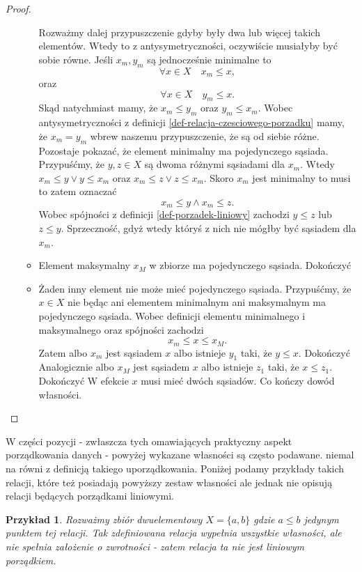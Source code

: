 \documentclass[12pt,a4paper]{report}
\newtheorem{example}{Przykład}
\begin{document}
\begin{proof}
\begin{enumerate}
\begin{itemize}
Rozważmy dalej przypuszczenie gdyby były dwa lub więcej takich elementów. Wtedy to z antysymetryczności, oczywiście musiałyby być sobie równe. Jeśli $x_m, y_m$ są jednocześnie minimalne to
$$
\forall x \in X \quad x_m \leq x,
$$
oraz 
$$
\forall x \in X \quad y_m \leq x.
$$
Skąd natychmiast mamy, że $ x_m \leq y_m$ oraz $y_m \leq x_m$. Wobec antysymetryczności z definicji \ref{def-relacja-czesciowego-porzadku} mamy, że $x_m = y_m$ wbrew naszemu przypuszczenie, że są od siebie różne.
Pozostaje pokazać, że element minimalny ma pojedynczego sąsiada. Przypuśćmy, że $y,z \in X$ są dwoma różnymi sąsiadami dla $x_m$. Wtedy $ x_m \leq y \lor y \leq x_m$ oraz $ x_m \leq z \lor z \leq x_m$. Skoro $x_m$ jest minimalny to musi to zatem oznaczać
$$
x_m \leq y \land x_m \leq z.
$$ 
Wobec spójności z definicji \ref{def-porzadek-liniowy} zachodzi $y \leq z$ lub $z \leq y$. Sprzeczność, gdyż wtedy któryś z nich nie mógłby być sąsiadem dla $x_m$.
\item Element maksymalny $x_M$ w zbiorze ma pojedynczego sąsiada. {\color{red} Dokończyć} %
\item Żaden inny element nie może mieć pojedynczego sąsiada. Przypuśćmy, że $x \in X$ nie będąc ani elementem minimalnym ani maksymalnym ma pojedynczego sąsiada. Wobec definicji elementu minimalnego i maksymalnego oraz spójności zachodzi
$$
x_m \leq x \leq x_M.
$$
Zatem albo $x_m$ jest sąsiadem $x$ albo istnieje $y_1$ taki, że $y \leq x$. {\color{red} Dokończyć} %
Analogicznie albo $x_M$ jest sąsiadem $x$ albo istnieje $z_1$ taki, że $x \leq z_1$. {\color{red} Dokończyć} %
W efekcie $x$ musi mieć dwóch sąsiadów. Co kończy dowód własności.
\end{itemize}
\end{enumerate}
\end{proof}

W części pozycji - zwłaszcza tych omawiających praktyczny aspekt porządkowania danych - powyżej wykazane własności są często podawane. niemal na równi z definicją takiego uporządkowania. Poniżej podamy przykłady takich relacji, które też posiadają powyższy zestaw własności ale jednak nie opisują relacji będących porządkami liniowymi. 

\begin{example}
Rozważmy zbiór dwuelementowy $X = \{ a, b \}$ gdzie $a \leq b$ jedynym punktem tej relacji. Tak zdefiniowana relacja wypełnia wszystkie własności, ale nie spełnia założenie o zwrotności - zatem relacja ta nie jest liniowym porządkiem.
\end{example}
\end{document}
